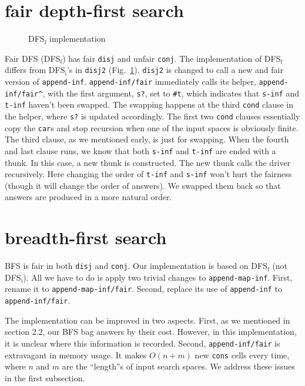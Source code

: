 \documentclass[format=acmlarge, review=true, authordraft=true]{acmart}
\newcommand{\conj}{\texttt{conj}}
\newcommand{\disj}{\texttt{disj}}
\begin{document}
\section{fair depth-first search}

\begin{figure}
	
	\caption{DFS$_\textrm{f}$ implementation}
	\label{fDFS}
\end{figure}

Fair DFS (DFS$_\textrm{f}$) has fair \disj{} and unfair \conj{}. The implementation of DFS$_\textrm{f}$ 
differs from DFS$_\textrm{i}$'s in \texttt{disj2} (Fig.~\ref{fDFS}). \texttt{disj2} is 
changed to call a new and fair version of \texttt{append-inf}. 
\texttt{append-inf/fair} immediately calls its helper, 
\texttt{append-inf/fair\^{}}, with the first argument, \texttt{s?}, set to 
\texttt{\#{}t}, which indicates that \texttt{s-inf} and \texttt{t-inf} haven't 
been swapped. The swapping happens at the third \texttt{cond} clause in the 
helper, where \texttt{s?} is updated accordingly. The first two \texttt{cond} 
clauses essentially copy the \texttt{car}s and stop recursion when one of the 
input spaces is obviously finite. The third clause, as we mentioned early, is 
just for swapping. When the fourth and last clause runs, we know that both 
\texttt{s-inf} and \texttt{t-inf} are ended with a thunk. In this case, a new 
thunk is constructed. The new thunk calls the driver recursively. Here changing 
the order of \texttt{t-inf} and \texttt{s-inf} won't hurt the fairness (though 
it will change the order of answers). We swapped them back so that answers are 
produced in a more natural order.


\section{breadth-first search}

BFS is fair in both \disj{} and \conj{}. Our implementation is based on 
DFS$_\textrm{f}$ (not DFS$_\textrm{i}$). All we have to do is apply two trivial changes to 
\texttt{append-map-inf}. First, rename it to \texttt{append-map-inf/fair}. 
Second, replace its use of \texttt{append-inf} to \texttt{append-inf/fair}. 

The implementation can be improved in two aspects. First, as we mentioned in 
section 2.2, our BFS bag answers by their cost. However, in this implementation, 
it is unclear where this information is recorded. Second, 
\texttt{append-inf/fair} is extravagant in memory usage. It makes 
$O(n+m)$ new \texttt{cons} cells every time, where $n$ and $m$ are the 
``length''s of input search spaces. We address these issues in the first 
subsection.
\end{document}
